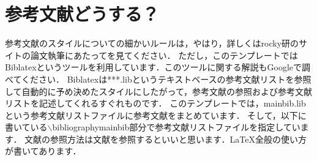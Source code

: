 \documentclass[11pt,twocolumn,a4paper, fleqn, uplatex]{ujarticle}
\begin{document}
\section{参考文献どうする？}
参考文献のスタイルについての細かいルールは，やはり，詳しくはrocky研のサイトの論文執筆にあたってを見てください．
ただし，このテンプレートではBiblatexというツールを利用しています．このツールに関する解説もGoogleで調べてください．
Biblatexは***.libというテキストベースの参考文献リストを参照して自動的に予め決めたスタイルにしたがって，参考文献の参照および参考文献リストを記述してくれるすぐれものです．
このテンプレートでは，mainbib.libという参考文献リストファイルに参考文献をまとめています．
そして，以下に書いている$\backslash$bibliography{mainbib}部分で参考文献リストファイルを指定しています．
文献の参照方法は文献\cite{latex2e}を参照するといいと思います．\LaTeX 全般の使い方が書いてあります．



\end{document}
